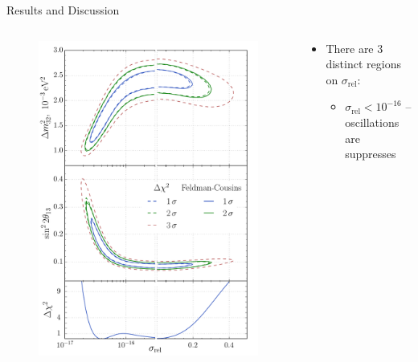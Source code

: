 \documentclass[usenames, dvipsnames]{beamer}
\newcommand{\Important}{\textcolor{BrickRed}}
\newcommand{\impitem}{\item[\Important{$\bullet$}]}
\newcommand{\srel}{\ensuremath{\sigma_{\text{rel}}}}
\begin{document}
\begin{frame}[fragile]
\begin{columns}[T]
\begin{column}{.47\textwidth}
\begin{block}{Results and Discussion}
    \begin{columns}[T]
        \begin{column}{0.42\textwidth}
            \begin{figure}
                \includegraphics[scale=1.125]{./pics/scan_db_s-dm-th_ihep-fc_v2.pdf}
            \end{figure}
        \end{column}
        \begin{column}{0.57\textwidth}
            \begin{itemize}
                \impitem There are 3 distinct regions on \Important{\srel}:
                \vspace*{-1.5cm}
                \begin{itemize}
                    \item \Important{$\srel < 10^{-16}$} -- oscillations are suppresses

\end{itemize}
\end{itemize}
\end{column}
\end{columns}
\end{block}
\end{column}
\end{columns}
\end{frame}
\end{document}
